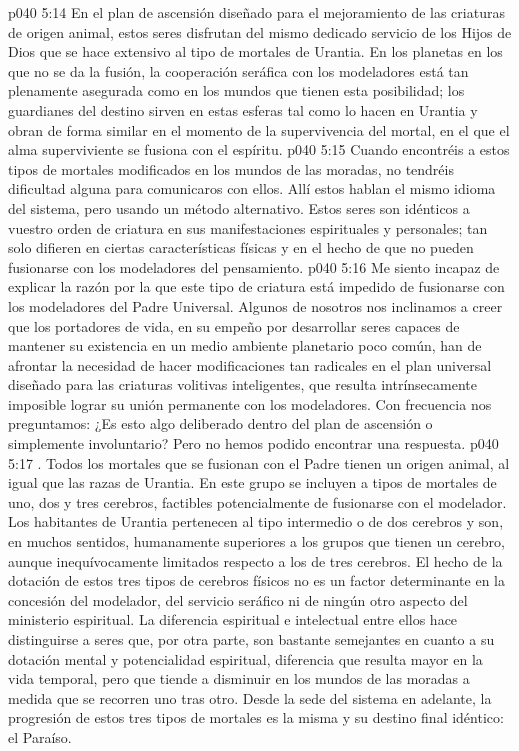 \vs p040 5:14 En el plan de ascensión diseñado para el mejoramiento de las criaturas de origen animal, estos seres disfrutan del mismo dedicado servicio de los Hijos de Dios que se hace extensivo al tipo de mortales de Urantia. En los planetas en los que no se da la fusión, la cooperación seráfica con los modeladores está tan plenamente asegurada como en los mundos que tienen esta posibilidad; los guardianes del destino sirven en estas esferas tal como lo hacen en Urantia y obran de forma similar en el momento de la supervivencia del mortal, en el que el alma superviviente se fusiona con el espíritu.
\vs p040 5:15 Cuando encontréis a estos tipos de mortales modificados en los mundos de las moradas, no tendréis dificultad alguna para comunicaros con ellos. Allí estos hablan el mismo idioma del sistema, pero usando un método alternativo. Estos seres son idénticos a vuestro orden de criatura en sus manifestaciones espirituales y personales; tan solo difieren en ciertas características físicas y en el hecho de que no pueden fusionarse con los modeladores del pensamiento.
\vs p040 5:16 Me siento incapaz de explicar la razón por la que este tipo de criatura está impedido de fusionarse con los modeladores del Padre Universal. Algunos de nosotros nos inclinamos a creer que los portadores de vida, en su empeño por desarrollar seres capaces de mantener su existencia en un medio ambiente planetario poco común, han de afrontar la necesidad de hacer modificaciones tan radicales en el plan universal diseñado para las criaturas volitivas inteligentes, que resulta intrínsecamente imposible lograr su unión permanente con los modeladores. Con frecuencia nos preguntamos: ¿Es esto algo deliberado dentro del plan de ascensión o simplemente involuntario? Pero no hemos podido encontrar una respuesta.
\vs p040 5:17 \pc {}. Todos los mortales que se fusionan con el Padre tienen un origen animal, al igual que las razas de Urantia. En este grupo se incluyen a tipos de mortales de uno, dos y tres cerebros, factibles potencialmente de fusionarse con el modelador. Los habitantes de Urantia pertenecen al tipo intermedio o de dos cerebros y son, en muchos sentidos, humanamente superiores a los grupos que tienen un cerebro, aunque inequívocamente limitados respecto a los de tres cerebros. El hecho de la dotación de estos tres tipos de cerebros físicos no es un factor determinante en la concesión del modelador, del servicio seráfico ni de ningún otro aspecto del ministerio espiritual. La diferencia espiritual e intelectual entre ellos hace distinguirse a seres que, por otra parte, son bastante semejantes en cuanto a su dotación mental y potencialidad espiritual, diferencia que resulta mayor en la vida temporal, pero que tiende a disminuir en los mundos de las moradas a medida que se recorren uno tras otro. Desde la sede del sistema en adelante, la progresión de estos tres tipos de mortales es la misma y su destino final idéntico: el Paraíso.
